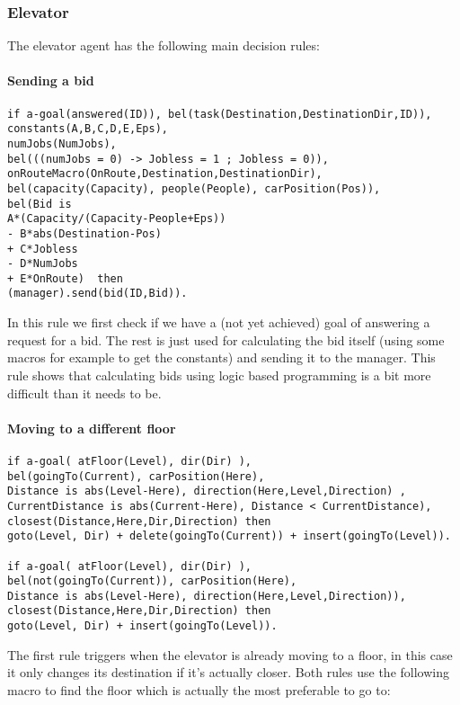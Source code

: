 \documentclass[a4paper,11pt]{article}
\begin{document}
\subsubsection{Elevator}
The elevator agent has the following main decision rules:

\paragraph*{Sending a bid}
\begin{verbatim}
if a-goal(answered(ID)), bel(task(Destination,DestinationDir,ID)),
constants(A,B,C,D,E,Eps),
numJobs(NumJobs),		
bel(((numJobs = 0) -> Jobless = 1 ; Jobless = 0)),
onRouteMacro(OnRoute,Destination,DestinationDir),
bel(capacity(Capacity), people(People), carPosition(Pos)),
bel(Bid is 
A*(Capacity/(Capacity-People+Eps)) 
- B*abs(Destination-Pos)
+ C*Jobless
- D*NumJobs
+ E*OnRoute)  then
(manager).send(bid(ID,Bid)).
\end{verbatim}

In this rule we first check if we have a (not yet achieved) goal of answering a request for a bid. The rest is just used for calculating the bid itself (using some macros for example to get the constants) and sending it to the manager. This rule shows that calculating bids using logic based programming is a bit more difficult than it needs to be.

\paragraph*{Moving to a different floor}
\begin{verbatim}
if a-goal( atFloor(Level), dir(Dir) ),
bel(goingTo(Current), carPosition(Here), 
Distance is abs(Level-Here), direction(Here,Level,Direction) , 
CurrentDistance is abs(Current-Here), Distance < CurrentDistance),
closest(Distance,Here,Dir,Direction) then 
goto(Level, Dir) + delete(goingTo(Current)) + insert(goingTo(Level)).

if a-goal( atFloor(Level), dir(Dir) ),
bel(not(goingTo(Current)), carPosition(Here), 
Distance is abs(Level-Here), direction(Here,Level,Direction)),
closest(Distance,Here,Dir,Direction) then
goto(Level, Dir) + insert(goingTo(Level)).
\end{verbatim}

The first rule triggers when the elevator is already moving to a floor, in this case it only changes its destination if it's actually closer. Both rules use the following macro to find the floor which is actually the most preferable to go to:
\end{document}
